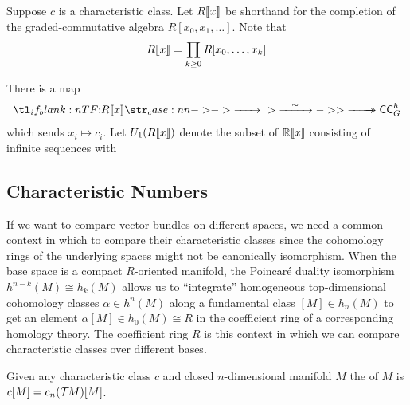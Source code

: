Suppose $c$ is a characteristic class. Let $R[\![x]\!]$ be shorthand for the completion of the graded-commutative algebra $R[x_0,x_1,\ldots]$. Note that
\[
		R[\![x]\!] = \prod_{k\geq 0} R[x_0,\ldots, x_k]
\]

There is a map
\[
	\lkxfunc{}{R\fps{x}}{\Class_G^h}
\]
which sends $x_i\mapsto c_i$. Let $U_1(R[\![x]\!])$ denote the subset of $\mathbb{R}[\![x]\!]$ consisting of infinite sequences with 

\begin{definition}
\end{definition}

\subsection{Characteristic Numbers}

If we want to compare vector bundles on different spaces, we need a common context in which to compare their characteristic classes since the cohomology rings of the underlying spaces might not be canonically isomorphism. When the base space is a compact $R$-oriented manifold, the Poincar\'e duality isomorphism $h^{n-k}(M) \cong h_k(M)$ allows us to ``integrate'' homogeneous top-dimensional cohomology classes $\alpha\in h^{n}(M)$ along a fundamental class $[M]\in h_n(M)$ to get an element $\alpha[M]\in h_0(M)\cong R$ in the coefficient ring of a corresponding homology theory. The coefficient ring $R$ is this context in which we can compare characteristic classes over different bases.

\begin{definition}\label{def:characteristic-number}
	Given any characteristic class $c$ and closed $n$-dimensional manifold $M$ the  of $M$ is $c[M] = c_n({\mathcal{T}\hspace{-0.1em}} M)[M]$.
\end{definition}

